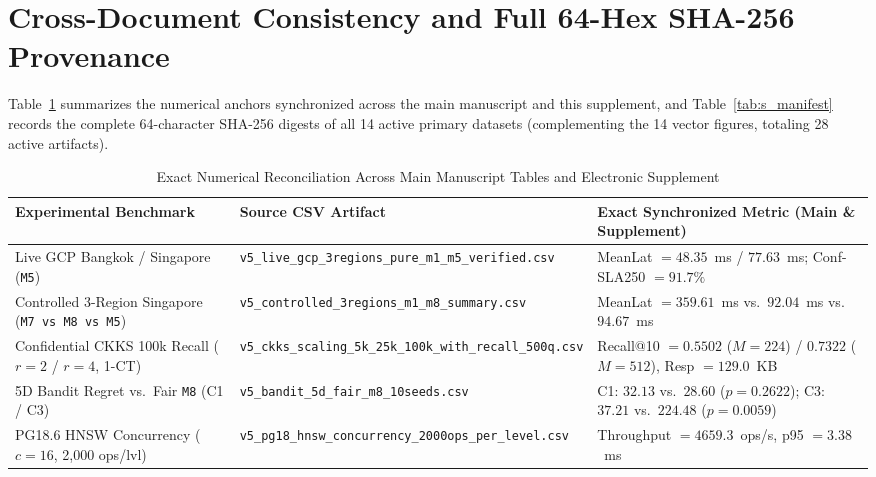 \documentclass[10pt,journal,compsoc]{IEEEtran}
\begin{document}
\clearpage

\section{Cross-Document Consistency and Full 64-Hex SHA-256 Provenance}
Table~\ref{tab:s_repro} summarizes the numerical anchors synchronized across the main manuscript and this supplement, and Table~\ref{tab:s_manifest} records the complete 64-character SHA-256 digests of all 14 active primary datasets (complementing the 14 vector figures, totaling 28 active artifacts).

\begin{table}[!t]
\centering
\caption{Exact Numerical Reconciliation Across Main Manuscript Tables and Electronic Supplement}
\label{tab:s_repro}
\footnotesize
\begin{adjustbox}{max width=\textwidth}
\begin{tabular}{lll}
\toprule
\textbf{Experimental Benchmark} & \textbf{Source CSV Artifact} & \textbf{Exact Synchronized Metric (Main \& Supplement)} \\
\midrule
Live GCP Bangkok / Singapore (\texttt{M5}) & \nolinkurl{v5_live_gcp_3regions_pure_m1_m5_verified.csv} & MeanLat $= 48.35$~ms / $77.63$~ms; Conf-SLA250 $= 91.7\%$ \\
Controlled 3-Region Singapore (\texttt{M7 vs M8 vs M5}) & \nolinkurl{v5_controlled_3regions_m1_m8_summary.csv} & MeanLat $= 359.61$~ms vs.\ $92.04$~ms vs.\ $94.67$~ms \\
Confidential CKKS 100k Recall ($r=2$ / $r=4$, 1-CT) & \nolinkurl{v5_ckks_scaling_5k_25k_100k_with_recall_500q.csv} & Recall@10 $= 0.5502$ ($M=224$) / $0.7322$ ($M=512$), Resp $= 129.0$~KB \\
5D Bandit Regret vs.\ Fair \texttt{M8} (C1 / C3) & \nolinkurl{v5_bandit_5d_fair_m8_10seeds.csv} & C1: $32.13$ vs.\ $28.60$ ($p=0.2622$); C3: $37.21$ vs.\ $224.48$ ($p=0.0059$) \\
PG18.6 HNSW Concurrency ($c=16$, 2,000 ops/lvl) & \nolinkurl{v5_pg18_hnsw_concurrency_2000ops_per_level.csv} & Throughput $= 4659.3$~ops/s, p95 $= 3.38$~ms \\
\bottomrule
\end{tabular}
\end{adjustbox}
\end{table}
\end{document}
